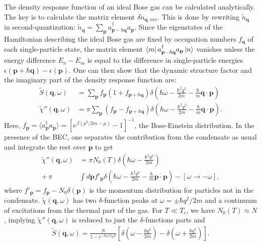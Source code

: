 \documentclass[reprint,
nofootinbib,
amsmath,amssymb,
aps]{revtex4-1}
\newcommand{\be}{\beta}
\newcommand{\f}[2]{\frac{#1}{#2}}
\newcommand{\lp}{\left(}
\newcommand{\rp}{\right)}
\newcommand{\lb}{\left[}
\newcommand{\rb}{\right]}
\begin{document}
The density response function of an ideal Bose gas can be calculated analytically. The key is to calculate the matrix element $\delta \widetilde{n}_{\mathbf{q},mn}$. This is done by rewriting $\widetilde{n}_\mathbf{q}$ in second-quantization: $\widetilde{n}_\mathbf{q} = \sum_\mathbf{p} a^\dagger_{\mathbf{p} - \hbar \mathbf{q}} a_\mathbf{p} $. Since the eigenstates of the Hamiltonian describing the ideal Bose gas are fixed by occupation numbers $f_\mathbf{q}$ of each single-particle state, the matrix element $\bra{m} a^\dagger_{\mathbf{p} - \hbar \mathbf{q}} a_\mathbf{p} \ket{n}$ vanishes unless the energy difference $E_n - E_m$ is equal to the difference in single-particle energies $\epsilon(\mathbf{p} + \hbar \mathbf{q}) - \epsilon(\mathbf{p})$. One can then show that the dynamic structure factor and the imaginary part of the density response function are:
\begin{align*}
\widetilde{S}(\mathbf{q},\omega) &= \sum_\mathbf{p} f_\mathbf{p}(1 + f_{\mathbf{p} + \hbar \mathbf{q}}) \delta 
\lp
\hbar \omega - \f{\hbar^2 q^2}{ 2m} - \f{\hbar }{m} \mathbf{q}\cdot \mathbf{p}
\rp \\
\widetilde{\chi}''(\mathbf{q},\omega) 
&= 
\pi \sum_\mathbf{p} (f_\mathbf{p} - f_{\mathbf{p} + \hbar \mathbf{q}}) \delta 
\lp  
\hbar \omega - \f{\hbar^2 q^2}{ 2m} - \f{\hbar }{m} \mathbf{q}\cdot \mathbf{p}
\rp.
\end{align*}
Here, $f_\mathbf{p} = \langle a^\dagger_\mathbf{p} a_\mathbf{p}\rangle = [e^{\be(p^2/2m - \mu)} - 1]^{-1}$, the Bose-Einstein distribution. In the presence of the BEC, one separates the contribution from the condensate as usual and integrate the rest over $\mathbf{p}$ to get
\begin{align*}
\widetilde{\chi}''(\mathbf{q},\omega) &= \pi  N_0(T) \delta \lp \hbar \omega - \f{\hbar^2 q^2}{2m} \rp  \\
 + \, \pi &\int d\mathbf{p} f'_\mathbf{p} \delta \lp \hbar \omega - \f{\hbar^2 q^2}{2m} - \f{\hbar}{m} \mathbf{p}\cdot \mathbf{p} \rp - [\omega \to -\omega], 
\end{align*}
where $f'_\mathbf{p} = f_\mathbf{p} - N_0 \delta(\mathbf{p})$ is the momentum distribution for particles not in the condensate. $\widetilde{\chi}(\mathbf{q},\omega)$ has two $\delta$-function peaks at $\omega = \pm \hbar q^2/2m$ and a continuum of excitations from the thermal part of the gas. For $T \ll T_c$, we have $N_0(T) \approx N$, implying $\widetilde{\chi}''(\mathbf{q},\omega)$ is reduced to just the $\delta$-functions parts and  
\begin{align*}
\widetilde{S}(\mathbf{q},\omega) = \f{N}{1 - e^{-\hbar \omega / k_BT}} \lb \delta\lp \omega - \f{\hbar q^2}{2m} \rp - \delta \lp  \omega + \f{\hbar q^2}{2m} \rp \rb.
\end{align*}
\end{document}
